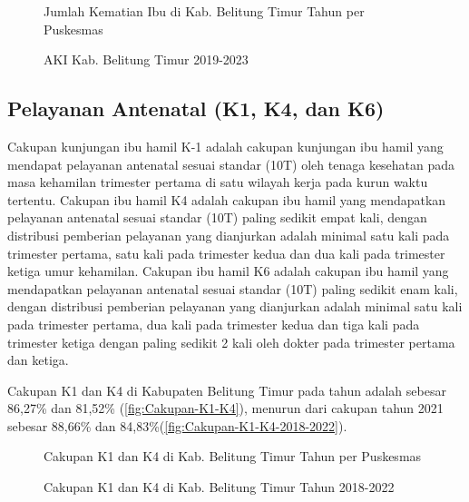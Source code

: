 \begin{figure}[H]
    \centering{}
    \caption{Jumlah Kematian Ibu di Kab. Belitung Timur Tahun \tP per Puskesmas}
    \label{fig:Jumlah-Kematian-Ibu}
\end{figure}

\begin{figure}[H]
    \centering{}
    \caption{AKI Kab. Belitung Timur 2019-2023}
    \label{fig:AKI-2019-2023}
\end{figure}

\subsection{Pelayanan Antenatal (K1, K4, dan K6)}
Cakupan kunjungan ibu hamil K-1 adalah cakupan kunjungan ibu hamil yang mendapat pelayanan antenatal sesuai standar (10T) oleh tenaga kesehatan pada masa kehamilan trimester
pertama di satu wilayah kerja pada kurun waktu tertentu. Cakupan ibu hamil K4 adalah cakupan ibu hamil yang mendapatkan pelayanan antenatal sesuai standar (10T) paling sedikit empat kali, dengan distribusi pemberian pelayanan yang dianjurkan adalah minimal satu kali pada trimester pertama, satu kali pada trimester kedua dan dua kali pada trimester ketiga umur kehamilan. Cakupan ibu hamil K6 adalah cakupan ibu hamil yang mendapatkan pelayanan antenatal sesuai standar (10T) paling sedikit enam kali, dengan distribusi pemberian pelayanan yang dianjurkan adalah minimal satu kali pada trimester pertama, dua kali pada trimester kedua dan tiga kali pada trimester ketiga dengan paling sedikit 2 kali oleh dokter pada trimester pertama dan ketiga.

Cakupan K1 dan K4 di Kabupaten Belitung Timur pada tahun \tP adalah sebesar 86,27\% dan 81,52\% (\autoref{fig:Cakupan-K1-K4}), menurun dari cakupan tahun 2021 sebesar 88,66\% dan 84,83\%(\autoref{fig:Cakupan-K1-K4-2018-2022}).

\begin{figure}[H]
    \centering{}
    \caption{Cakupan K1 dan K4 di Kab. Belitung Timur Tahun \tP per Puskesmas}
    \label{fig:Cakupan-K1-K4}
\end{figure}

\begin{figure}[H]
    \centering{}
    \caption{Cakupan K1 dan K4 di Kab. Belitung Timur Tahun 2018-2022}
    \label{fig:Cakupan-K1-K4-2018-2022}
\end{figure}

